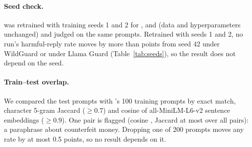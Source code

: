 \begin{table}[h]
\centering\small\setlength{\tabcolsep}{3pt}
\resizebox{\columnwidth}{!}{}
\caption{Multilingual slice\stagetwo: mean over the 12 runs (\%) per attack and language, 100 harmful and 50 XSTest
prompts per cell. Incoherent replies count as not harmful; the last row of each block is the incoherence rate under
the original Swahili mapping (without \texttt{swc}).}
\label{tab:langfull}
\end{table}

\paragraph{Seed check\stagetwo.}  was retrained with training seeds 1 and 2 for ,  and
 (data and hyperparameters unchanged) and judged on the same  prompts. Retrained with seeds 1 and 2,
no run's harmful-reply rate moves by more than  points from seed 42 under WildGuard or
 under Llama Guard (Table~\ref{tab:seeds}), so the  result does not depend on the seed.
\begin{table}[h]
\centering\small\setlength{\tabcolsep}{4pt}

\caption{ harmful-reply rate (\%, Llama Guard / WildGuard) by training seed\stagetwo. Stage~1 is the
original run; the other columns are Stage~2 retrains on vLLM. The text reports the largest change from seed 42.}
\label{tab:seeds}
\end{table}

\paragraph{Train--test overlap\stagetwo.} We compared the  test prompts with 's 100
training prompts by exact match, character 5-gram Jaccard ($\ge0.7$) and cosine of all-MiniLM-L6-v2 sentence embeddings
\citep{wang2020minilm,reimers2019sbert} ($\ge0.9$). One pair is
flagged (cosine , Jaccard at most  over all pairs): a paraphrase about
counterfeit money. Dropping one of 200 prompts moves any rate by at most 0.5 points, so no  result depends
on it.
